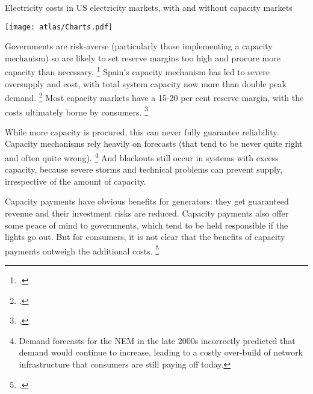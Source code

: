 \documentclass[FrontPage]{grattan}
\begin{document}
\begin{figureTop}
\caption{Electricity costs in US electricity markets, with and without capacity markets}\label{fig:electricity-costs-in-US-electricity-markets-with-and-without-capacity-markets}
\texttt{[image: atlas/Charts.pdf]}
\end{figureTop}

Governments are risk-averse (particularly those implementing a capacity mechanism) so are likely to set reserve margins too high and procure more capacity than necessary.%
\footcite{NewberyGrubb2014SecurityOfSupply}
Spain's capacity mechanism has led to severe oversupply and cost, with total system capacity now more than double peak demand.%
\footcite{Wynn2016SpainCapacityMechanism}
Most capacity markets have a 15-20 per cent reserve margin, with the costs ultimately borne by consumers.%
\footcite{bowring2013capacity}


While more capacity is procured, this can never fully guarantee reliability. Capacity mechanisms rely heavily on forecasts (that tend to be never quite right and often quite wrong).%
\footnote{\eg{} Demand forecasts for the NEM in the late 2000s incorrectly predicted that demand would continue to increase, leading to a costly over-build of network infrastructure that consumers are still paying off today.}
And blackouts still occur in systems with excess capacity, because severe storms and technical problems can prevent supply, irrespective of the amount of capacity.

Capacity payments have obvious benefits for generators: they get guaranteed revenue and their investment risks are reduced. Capacity payments also offer some peace of mind to governments, which tend to be held responsible if the lights go out. But for consumers, it is not clear that the benefits of capacity payments outweigh the additional costs.%
\footcites{CIGRE2016CapacityMechanisms}{NewberyGrubb2014SecurityOfSupply}{Oxford2016ElectricityMarketsBroken}
\end{document}
